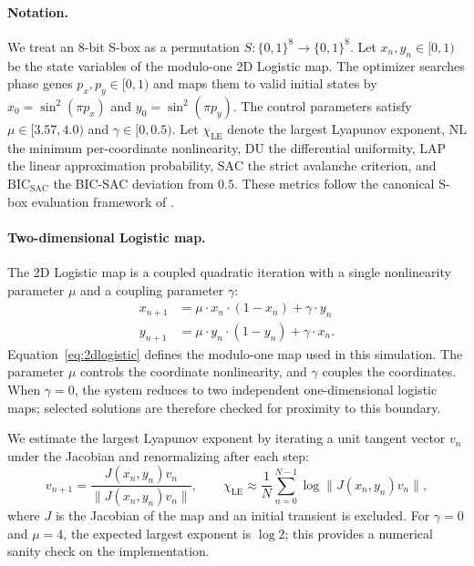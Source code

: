 \documentclass[11pt,a4paper]{article}
\begin{document}
\paragraph{Notation.}
We treat an 8-bit S-box as a permutation $S:\{0,1\}^8 \to \{0,1\}^8$.
Let $x_n, y_n \in [0, 1)$ be the state variables of the modulo-one
2D Logistic map. The optimizer searches phase genes
$p_x,p_y\in[0,1)$ and maps them to valid initial states by
$x_0=\sin^2(\pi p_x)$ and $y_0=\sin^2(\pi p_y)$. The control
parameters satisfy $\mu\in[3.57,4.0)$ and $\gamma\in[0,0.5)$. Let
$\chi_\mathrm{LE}$ denote the largest Lyapunov exponent, $\mathrm{NL}$
the minimum per-coordinate nonlinearity, $\mathrm{DU}$ the
differential uniformity, $\mathrm{LAP}$ the linear approximation
probability, $\mathrm{SAC}$ the strict avalanche criterion, and
$\mathrm{BIC}_\mathrm{SAC}$ the BIC-SAC deviation from $0.5$. These
metrics follow the canonical S-box evaluation framework of
\cite{adams2010goodsboxes, carlet2020indicator}
\cite{matsui1993linear, nyberg1993perfect}
\cite{biham1991differential, carlet2020indicator}.

\paragraph{Two-dimensional Logistic map.}
The 2D Logistic map is a coupled quadratic iteration with a single
nonlinearity parameter $\mu$ and a coupling parameter $\gamma$:
\begin{equation}
  \begin{aligned}
    x_{n+1} &= \mu \cdot x_n \cdot (1 - x_n) + \gamma \cdot y_n \\
    y_{n+1} &= \mu \cdot y_n \cdot (1 - y_n) + \gamma \cdot x_n.
  \end{aligned}
  \label{eq:2dlogistic}
\end{equation}
Equation~\ref{eq:2dlogistic} defines the modulo-one map used in this
simulation. The parameter $\mu$ controls the coordinate nonlinearity,
and $\gamma$ couples the coordinates. When $\gamma=0$, the system
reduces to two independent one-dimensional logistic maps; selected
solutions are therefore checked for proximity to this boundary.

We estimate the largest Lyapunov exponent by iterating a unit tangent
vector $v_n$ under the Jacobian and renormalizing after each step:
\begin{equation}
  v_{n+1}=\frac{J(x_n,y_n)v_n}{\|J(x_n,y_n)v_n\|},\qquad
  \chi_\mathrm{LE}\approx\frac{1}{N}\sum_{n=0}^{N-1}
  \log\|J(x_n,y_n)v_n\|,
  \label{eq:le}
\end{equation}
where $J$ is the Jacobian of the map and an initial transient is
excluded. For $\gamma=0$ and $\mu=4$, the expected largest exponent
is $\log 2$; this provides a numerical sanity check on the implementation.
\end{document}
